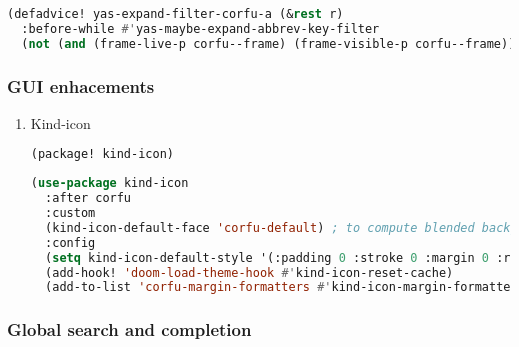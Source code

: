 \documentclass[11pt]{article}
\begin{document}
\begin{enumerate}
\begin{enumerate}
  \begin{lstlisting}[language=Lisp]
(defadvice! yas-expand-filter-corfu-a (&rest r)
  :before-while #'yas-maybe-expand-abbrev-key-filter
  (not (and (frame-live-p corfu--frame) (frame-visible-p corfu--frame))))
\end{lstlisting}
\end{enumerate}

\end{enumerate}

\subsubsection{GUI enhacements}
\label{sec:gui-enhacements}


\begin{enumerate}
  \item Kind-icon
  \label{sec:kind-icon}

  \begin{lstlisting}[language=Lisp]
(package! kind-icon)
\end{lstlisting}

\begin{lstlisting}[language=Lisp]
(use-package kind-icon
  :after corfu
  :custom
  (kind-icon-default-face 'corfu-default) ; to compute blended backgrounds correctly
  :config
  (setq kind-icon-default-style '(:padding 0 :stroke 0 :margin 0 :radius 0 :height 0.8 :scale 1.0))
  (add-hook! 'doom-load-theme-hook #'kind-icon-reset-cache)
  (add-to-list 'corfu-margin-formatters #'kind-icon-margin-formatter))
\end{lstlisting}
\end{enumerate}

\subsubsection{Global search and completion}
\label{sec:global-search-and-completion}
\end{document}
